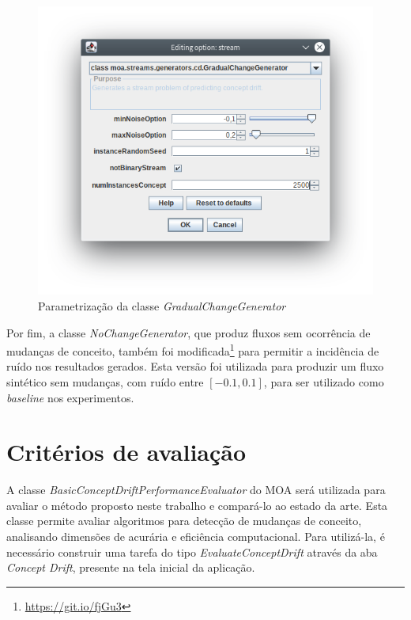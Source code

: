 \documentclass[qual, classic, a4paper]{ufbathesis}
\begin{document}
\begin{figure}[H]
    \begin{center}
        \includegraphics[width=\textwidth]{imagens/gradual_change_generator.png}
        \caption{Parametrização da classe \textit{GradualChangeGenerator}}
        \label{fig:gradual_change_generator}
    \end{center}
\end{figure}

Por fim, a classe \textit{NoChangeGenerator}, que produz fluxos sem ocorrência de mudanças de conceito, também foi modificada\footnote{\url{https://git.io/fjGu3}} para permitir a incidência de ruído nos resultados gerados.
Esta versão foi utilizada para produzir um fluxo sintético sem mudanças, com ruído entre $[-0.1, 0.1]$, para ser utilizado como \textit{baseline} nos experimentos.

\section{Critérios de avaliação}

A classe \textit{BasicConceptDriftPerformanceEvaluator} do MOA será utilizada para avaliar o método proposto neste trabalho e compará-lo ao estado da arte.
Esta classe permite avaliar algoritmos para detecção de mudanças de conceito, analisando dimensões de acurária e eficiência computacional.
Para utilizá-la, é necessário construir uma tarefa do tipo \textit{EvaluateConceptDrift} através da aba \textit{Concept Drift}, presente na tela inicial da aplicação.
\end{document}
